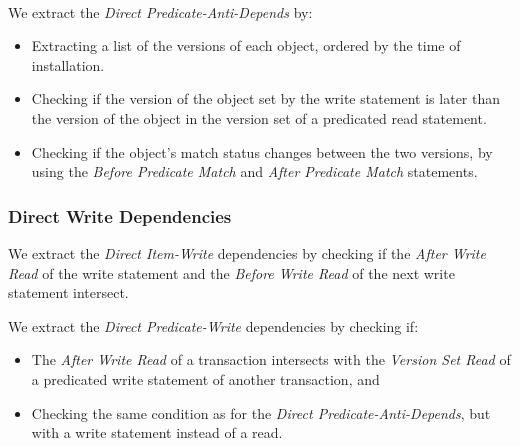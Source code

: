 \

We extract the \textit{Direct Predicate-Anti-Depends} by:
\begin{itemize}
    \item Extracting a list of the versions of each object, ordered by the time of installation.
    \item Checking if the version of the object set by the write statement is later than the version of the object in the version set of a predicated read statement.
    \item Checking if the object's match status changes between the two versions, by using the \textit{Before Predicate Match} and \textit{After Predicate Match} statements.
\end{itemize}

\subsubsection{Direct Write Dependencies}

We extract the \textit{Direct Item-Write} dependencies by checking if the \textit{After Write Read} of the write statement and the \textit{Before Write Read} of the next write statement intersect.

We extract the \textit{Direct Predicate-Write} dependencies by checking if:
\begin{itemize}
    \item The \textit{After Write Read} of a transaction intersects with the \textit{Version Set Read} of a predicated write statement of another transaction, and
    \item Checking the same condition as for the \textit{Direct Predicate-Anti-Depends}, but with a write statement instead of a read.
\end{itemize}
